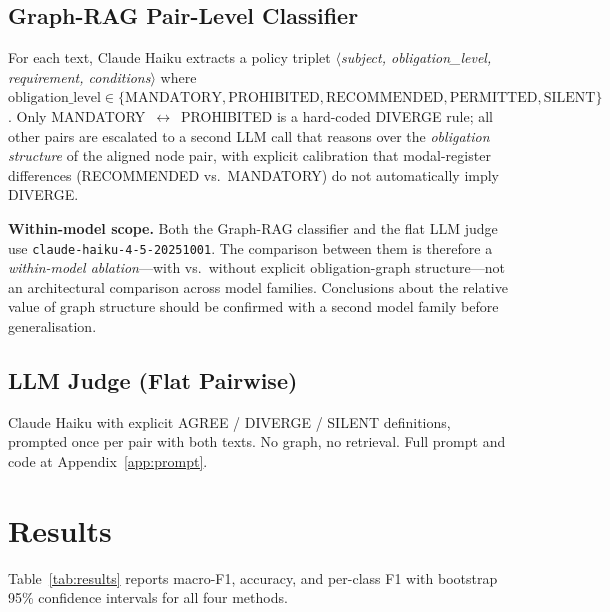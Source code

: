 \documentclass[manuscript]{acmart}
\begin{document}
\subsection{Graph-RAG Pair-Level Classifier}

For each text, Claude Haiku extracts a policy triplet
$\langle$\textit{subject, obligation\_level, requirement, conditions}$\rangle$
where $\text{obligation\_level} \in \{\text{MANDATORY}, \text{PROHIBITED},
\text{RECOMMENDED}, \text{PERMITTED}, \text{SILENT}\}$. Only
MANDATORY~$\leftrightarrow$~PROHIBITED is a hard-coded DIVERGE rule; all other
pairs are escalated to a second LLM call that reasons over the
\textit{obligation structure} of the aligned node pair, with explicit
calibration that modal-register differences (RECOMMENDED vs.\ MANDATORY) do not
automatically imply DIVERGE.

\textbf{Within-model scope.} Both the Graph-RAG classifier and the flat LLM
judge use \texttt{claude-haiku-4-5-20251001}. The comparison between them is
therefore a \textit{within-model ablation}---with vs.\ without explicit
obligation-graph structure---not an architectural comparison across model
families. Conclusions about the relative value of graph structure should be
confirmed with a second model family before generalisation.

\subsection{LLM Judge (Flat Pairwise)}

Claude Haiku with explicit AGREE / DIVERGE / SILENT definitions, prompted once
per pair with both texts. No graph, no retrieval. Full prompt and code at
Appendix~\ref{app:prompt}.

\section{Results}
\label{sec:results}

Table~\ref{tab:results} reports macro-F1, accuracy, and per-class F1 with
bootstrap 95\% confidence intervals for all four methods.
\end{document}
